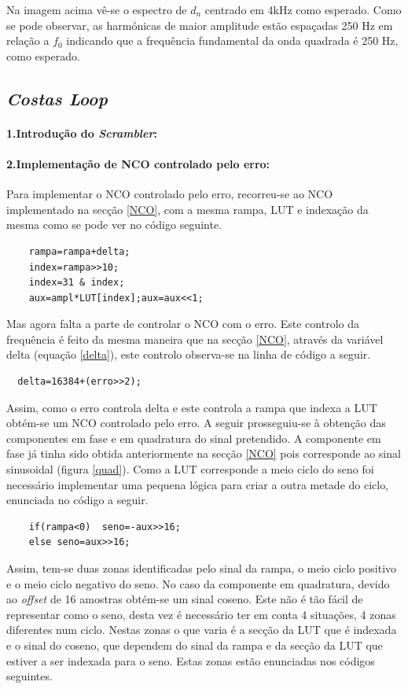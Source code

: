 \documentclass[11pt]{article}
\numberwithin{equation}{section}
\begin{document}
Na imagem acima vê-se o espectro de $d_n$ centrado em 4kHz como esperado. Como se pode observar, as harmónicas de maior amplitude estão espaçadas 250 Hz em relação a $f_0$ indicando que a frequência fundamental da onda quadrada é 250 Hz, como esperado.

\subsection{\textit{Costas Loop}}

\paragraph{1.Introdução do \textit{Scrambler}:} \hspace{0pt}


\paragraph{2.Implementação de NCO controlado pelo erro:} \hspace{0pt}

Para implementar o NCO controlado pelo erro, recorreu-se ao NCO implementado na secção \ref{NCO}, com a mesma rampa, LUT e indexação da mesma como se pode ver no código seguinte.
\begin{lstlisting}
	rampa=rampa+delta;
	index=rampa>>10;
	index=31 & index;
	aux=ampl*LUT[index];aux=aux<<1;
\end{lstlisting}
Mas agora falta a parte de controlar o NCO com o erro. Este controlo da frequência é feito da mesma maneira que na secção \ref{NCO}, através da variável delta (equação \ref{delta}), este controlo observa-se na linha de código a seguir.
\begin{lstlisting}
  delta=16384+(erro>>2);
\end{lstlisting}
Assim, como o erro controla delta e este controla a rampa que indexa a LUT obtém-se um NCO controlado pelo erro.
A seguir prosseguiu-se à obtenção das componentes em fase e em quadratura do sinal pretendido. A componente em fase já tinha sido obtida anteriormente na secção \ref{NCO} pois corresponde ao sinal sinusoidal (figura \ref{quad}). Como a LUT corresponde a meio ciclo do seno foi necessário implementar uma pequena lógica para criar a outra metade do ciclo, enunciada no código a seguir.
\begin{lstlisting}
	if(rampa<0)  seno=-aux>>16;
	else seno=aux>>16;
\end{lstlisting}
Assim, tem-se duas zonas identificadas pelo sinal da rampa, o meio ciclo positivo e o meio ciclo negativo do seno.
No caso da componente em quadratura, devido ao \textit{offset} de 16 amostras obtém-se um sinal coseno. Este não é tão fácil de representar como o seno, desta vez é necessário ter em conta 4 situações, 4 zonas diferentes num ciclo. Nestas zonas o que varia é a secção da LUT que é indexada e o sinal do coseno, que dependem do sinal da rampa e da secção da LUT que estiver a ser indexada para o seno. Estas zonas estão enunciadas nos códigos seguintes.
\vspace{1mm}
\end{document}
